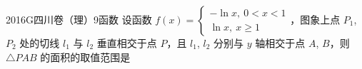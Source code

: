
\begin{problem}{2016}{G}{四川卷（理）}{9}{函数}
设函数 $f(x)=\begin{cases}
-\ln x,\ 0<x<1\\
\ln x,\ x\geqslant 1
\end{cases}$，图象上点 $P_1$, $P_2$ 处的切线 $l_1$ 与 $l_2$ 垂直相交于点 $P$，且 $ l_1 $, $ l_2 $ 分别与 $ y $ 轴相交于点 $ A $, $ B $，则 $ \triangle PAB $ 的面积的取值范围是
\begin{choices}
\end{choices}
\end{problem}

\begin{answer}

\end{answer}

\begin{solutions}

\end{solutions}